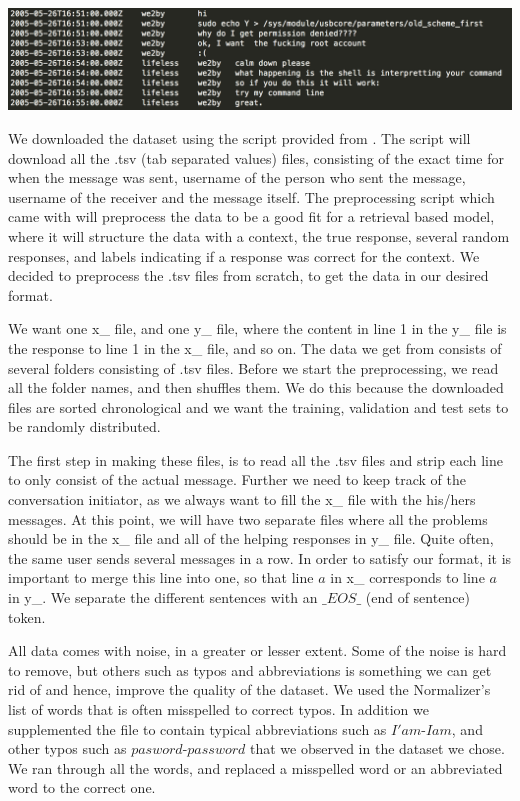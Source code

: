 \documentclass{article} %
\begin{document}
\includegraphics[scale=0.5]{tsv_file_example} \newline

We downloaded the dataset using the script provided from \cite{Ubuntuv2}. The script will download all the .tsv (tab separated values) files, consisting of the exact time for when the message was sent, username of the person who sent the message, username of the receiver and the message itself. The preprocessing script which came with \cite{Ubuntuv2} will preprocess the data to be a good fit for a retrieval based model, where it will structure the data with a context, the true response, several random responses, and labels indicating if a response was correct for the context. We decided to preprocess the .tsv files from scratch, to get the data in our desired format.

We want one x\_ file, and one y\_ file, where the content in line 1 in the y\_ file is the response to line 1 in the x\_ file, and so on. The data we get from \cite{Ubuntuv2} consists of several folders consisting of .tsv files. Before we start the preprocessing, we read all the folder names, and then shuffles them. We do this because the downloaded files are sorted chronological and we want the training, validation and test sets to be randomly distributed. 

The first step in making these files, is to read all the .tsv files and strip each line to only consist of the actual message. Further we need to keep track of the conversation initiator, as we always want to fill the x\_ file with the his/hers messages. At this point, we will have two separate files where all the problems should be in the x\_ file and all of the helping responses in y\_ file. Quite often, the same user sends several messages in a row. In order to satisfy our format, it is important to merge this line into one, so that line $a$ in x\_ corresponds to line $a$ in y\_. We separate the different sentences with an $\_EOS\_$ (end of sentence) token.

All data comes with noise, in a greater or lesser extent. Some of the noise is hard to remove, but others such as typos and abbreviations is something we can get rid of and hence, improve the quality of the dataset. We used the Normalizer's \cite{Normalizer_spellfix} list of words that is often misspelled to correct typos. In addition we supplemented the file to contain typical abbreviations such as $I'am$-$I am$, and other typos such as $pasword$-$password$ that we observed in the dataset we chose. We ran through all the words, and replaced a misspelled word or an abbreviated word to the correct one.
\end{document}

